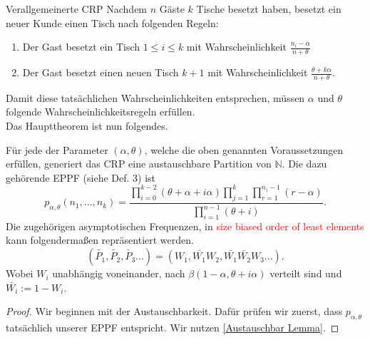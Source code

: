 \begin{section}{Verallgemeinerte CRP}
Nachdem $n$ Gäste $k$ Tische besetzt haben, besetzt ein neuer Kunde einen Tisch nach folgenden Regeln:
\begin{enumerate}
    \item Der Gast besetzt ein Tisch $1 \leq i \leq k$ mit Wahrscheinlichkeit $\frac{n_i-\alpha}{n + \theta}$ 
    \item Der Gast besetzt einen neuen Tisch $k+1$ mit Wahrscheinlichkeit $\frac{\theta + k\alpha}{n + \theta}$.
\end{enumerate}
Damit diese tatsächlichen Wahrscheinlichkeiten entsprechen, müssen $\alpha$ und $\theta$ folgende Wahrscheinlichkeitsregeln erfüllen. \\
Das Haupttheorem ist nun folgendes.
\begin{theorem}
    Für jede der Parameter $(\alpha,\theta)$, welche die oben genannten Voraussetzungen erfüllen, generiert das CRP eine austauschbare  Partition von $\mathbb{N}$. Die dazu gehörende EPPF (siehe Def. 3) ist 
    \begin{equation}
   p_{\alpha,\theta}(n_1,...,n_k) = \frac{\displaystyle \prod_{i=0}^{k-2}(\theta + \alpha + i\alpha)\prod_{j=1}^{k}\prod_{r=1}^{n_i-1}(r-\alpha)}{\displaystyle\prod_{i=1}^{n-1}(\theta  + i)}.
    \end{equation}
    Die zugehörigen asymptotischen Frequenzen, in \textcolor{red}{size biased order of least elements} kann folgendermaßen repräsentiert werden.
    \[
    (\tilde{P_1},\tilde{P_2},\tilde{P_3}...) = (W_1,\bar{W_1}W_2,\bar{W_1}\bar{W_2}W_3...).
    \]
    Wobei $W_i$ unabhängig voneinander, nach $\beta(1 - \alpha, \theta + i\alpha)$ verteilt sind und $\bar{W_i}:= 1 - W_i$.
\end{theorem}  
\begin{proof}
   Wir beginnen mit der Austauschbarkeit. Dafür prüfen wir zuerst, dass $p_{\alpha,\theta}$ tatsächlich unserer EPPF entspricht. Wir nutzen \ref{Austauschbar Lemma}.
\end{proof}

\end{section}